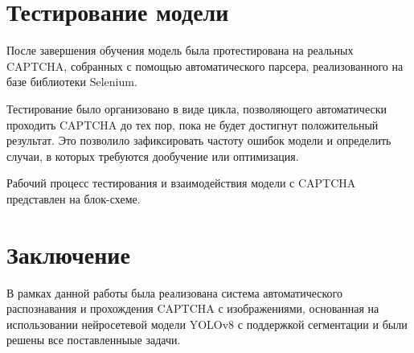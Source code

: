 \documentclass{altsu-report}
\begin{document}
\section*{Тестирование модели}

После завершения обучения модель была протестирована на реальных CAPTCHA, собранных с помощью автоматического парсера, реализованного на базе библиотеки Selenium.

Тестирование было организовано в виде цикла, позволяющего автоматически проходить CAPTCHA до тех пор, пока не будет достигнут положительный результат. Это позволило зафиксировать частоту ошибок модели и определить случаи, в которых требуются дообучение или оптимизация.

Рабочий процесс тестирования и взаимодействия модели с CAPTCHA представлен на блок-схеме.

\section*{Заключение}

В рамках данной работы была реализована система автоматического распознавания и прохождения CAPTCHA с изображениями, основанная на использовании нейросетевой модели YOLOv8 с поддержкой сегментации и были решены все поставленныые задачи.
    
\end{document}
